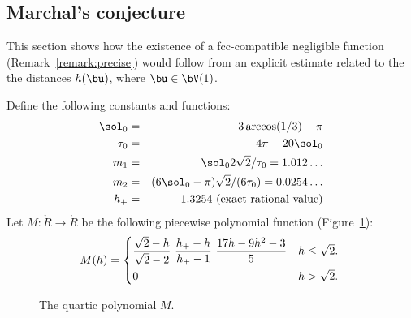 \subsection{Marchal's conjecture}

This section shows how the existence of a fcc-compatible negligible
function (Remark~\ref{remark:precise})  would follow from an explicit
estimate related to the the distances $h(\bu)$, where $\bu\in \bV(1)$.



\begin{definition} 
Define the following constants and functions: 
\begin{eqnarray}\label{eqn:m-def} 
\sol_0 &=& 3\arccos(1/3)-\pi\\
\tau_0 &=& 4\pi  - 20\sol_0\\
m_1 &=& \sol_0 2\sqrt2/\tau_0 = 1.012\ldots \\ %
m_2  &=&  (6\sol_0- \pi)\sqrt2/(6 \tau_0) = 0.0254\ldots\\ %
h_+ &=& 1.3254 \hbox{~(exact rational value)}
\end{eqnarray}
Let $M:\ring{R}\to\ring{R}$ 
be the following piecewise polynomial function (Figure~\ref{fig:M}):
\begin{equation}\label{eqn:M} 
M(h) =
\begin{cases} 
\dfrac{\sqrt2-h}{\sqrt2-2}~ \dfrac{h_+-h}{h_+-1} ~\dfrac{17 h - 9 h^2 - 3}{5} & h \le \sqrt2.\vspace{3pt} \\
0 & h >\sqrt2.
\end{cases}
\\
\end{equation}
\end{definition}

\begin{figure}[htb]
\centering
{}
\caption{The quartic polynomial $M$.}
\label{fig:M}
\end{figure}

